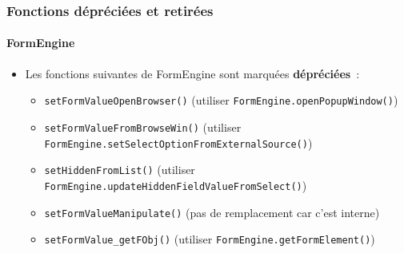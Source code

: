 \begin{frame}[fragile]
	\frametitle{Fonctions dépréciées et retirées}
	\framesubtitle{FormEngine}

	\lstset{basicstyle=\tiny\ttfamily}

	\begin{itemize}
		\item Les fonctions suivantes de FormEngine sont marquées \textbf{dépréciées}~:

			\begin{itemize}
				\item \texttt{setFormValueOpenBrowser()}\newline
					\smaller(utiliser \texttt{FormEngine.openPopupWindow()})\small

				\item \texttt{setFormValueFromBrowseWin()}\newline
					\smaller(utiliser \texttt{FormEngine.setSelectOptionFromExternalSource()})\small

				\item \texttt{setHiddenFromList()}\newline
					\smaller(utiliser \texttt{FormEngine.updateHiddenFieldValueFromSelect()})\small

				\item \texttt{setFormValueManipulate()}\newline
					\smaller(pas de remplacement car c'est interne)\small

				\item \texttt{setFormValue\_getFObj()}\newline
					\smaller(utiliser \texttt{FormEngine.getFormElement()})\small

			\end{itemize}

	\end{itemize}

\end{frame}


